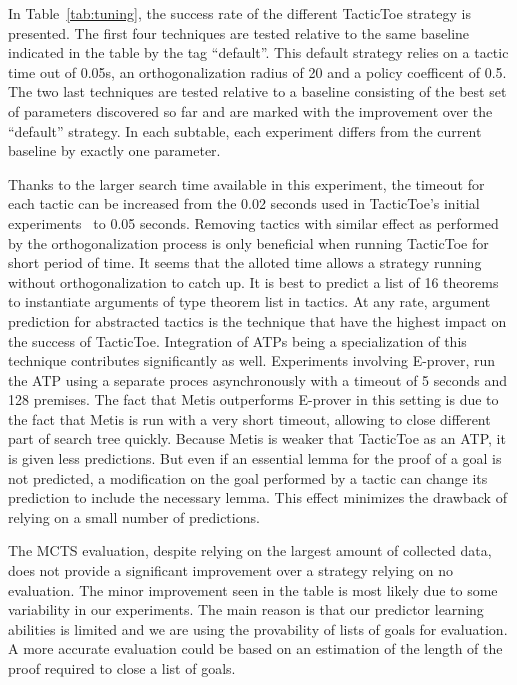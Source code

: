 \documentclass[runningheads,a4paper,draft]{svjour3}
\def\eprover{\textsf{E-prover}\xspace}
\def\metis{\textsf{Metis}\xspace}
\def\tactictoe{\textsf{TacticToe}\xspace}
\begin{document}
In Table~\ref{tab:tuning}, the success rate of the different \tactictoe
strategy is presented.
The first four techniques are tested relative to the same baseline indicated in
the table by the tag ``default''.  This default strategy relies on a tactic
time out of 0.05s, an orthogonalization radius of 20 and a policy coefficent of
0.5.
The two last techniques are tested relative
to a baseline consisting of the best set of parameters discovered so far and
are marked with the improvement over the ``default'' strategy.
In each subtable, each experiment differs from the current baseline by exactly
one parameter.

Thanks to the larger search time available in this experiment, the timeout for
each tactic can be increased from the 0.02 seconds used in \tactictoe's initial
experiments~\cite{tgckju-lpar17} to 0.05
seconds. Removing tactics with similar effect as performed by the
orthogonalization process is only beneficial when running \tactictoe for short
period of time. It seems that the alloted time allows a strategy
running without orthogonalization to catch up.
It is best to predict a list of 16 theorems to instantiate arguments of type
theorem list in tactics. At any rate, argument prediction for abstracted
tactics is the technique that have the highest impact on the success of
\tactictoe. Integration of ATPs being a specialization of this technique
contributes significantly as well. Experiments involving \eprover, run the ATP
using a separate proces asynchronously with a timeout of 5 seconds and 128 premises.
The fact that \metis outperforms \eprover in this setting is due to the fact
that \metis is run with a very short timeout, allowing to close different part
of search tree quickly. Because \metis is weaker that \tactictoe as an ATP, it
is given less predictions. But even if an essential lemma for the proof of a
goal is not predicted, a modification on the goal performed by a tactic can
change its prediction to include the necessary lemma.
This effect minimizes the drawback of relying on a small number of predictions.

The MCTS evaluation, despite relying on the largest amount of collected data,
does not provide a significant improvement over a strategy relying on no
evaluation. The minor improvement seen in the table is most likely due to some
variability in our experiments.
The main reason is that our predictor learning abilities is
limited and we are using the provability of lists of goals for evaluation. A
more accurate evaluation could be based on an estimation of the length of the
proof required to close a list of goals.
\end{document}

